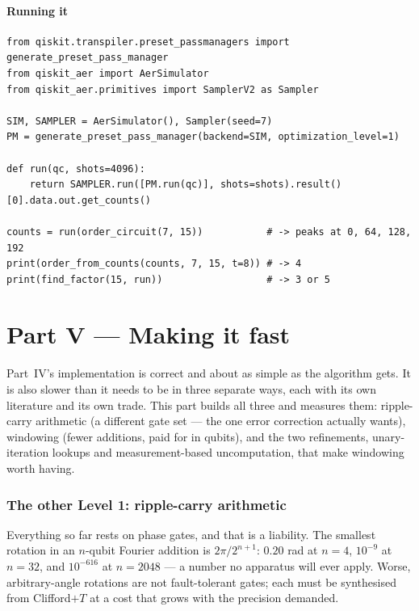 \documentclass[11pt]{article}
\theoremstyle{plain}
\theoremstyle{remark}
\begin{document}
\subsection*{Running it}

\begin{lstlisting}
from qiskit.transpiler.preset_passmanagers import generate_preset_pass_manager
from qiskit_aer import AerSimulator
from qiskit_aer.primitives import SamplerV2 as Sampler

SIM, SAMPLER = AerSimulator(), Sampler(seed=7)
PM = generate_preset_pass_manager(backend=SIM, optimization_level=1)

def run(qc, shots=4096):
    return SAMPLER.run([PM.run(qc)], shots=shots).result()[0].data.out.get_counts()

counts = run(order_circuit(7, 15))           # -> peaks at 0, 64, 128, 192
print(order_from_counts(counts, 7, 15, t=8)) # -> 4
print(find_factor(15, run))                  # -> 3 or 5
\end{lstlisting}


\part*{Part V --- Making it fast}

\noindent
Part~IV's implementation is correct and about as simple as the algorithm gets. It is also slower
than it needs to be in three separate ways, each with its own literature and its own trade. This
part builds all three and measures them: ripple-carry arithmetic (a different gate set --- the one
error correction actually wants), windowing (fewer additions, paid for in qubits), and the two
refinements, unary-iteration lookups and measurement-based uncomputation, that make windowing worth
having.

\section{The other Level 1: ripple-carry arithmetic}\label{im:sec:rc}

Everything so far rests on phase gates, and that is a liability. The smallest rotation in an
$n$-qubit Fourier addition is $2\pi/2^{n+1}$: $0.20$ rad at $n=4$, $10^{-9}$ at $n=32$, and
$10^{-616}$ at $n=2048$ --- a number no apparatus will ever apply. Worse, arbitrary-angle rotations
are not fault-tolerant gates; each must be synthesised from Clifford$+T$ at a cost that grows with
the precision demanded.
\end{document}
